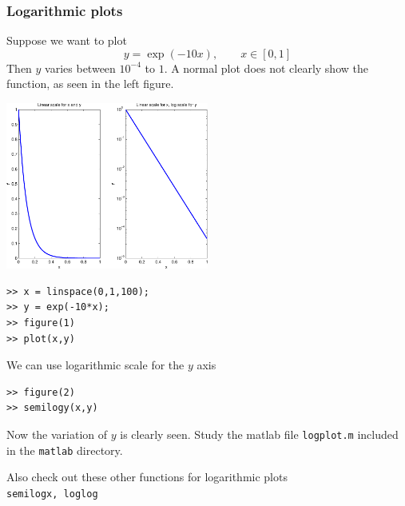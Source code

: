 \documentclass[11pt,xcolor=svgnames,onlymath]{beamer}
\begin{document}
\begin{frame}
\frametitle{Logarithmic plots}
Suppose we want to plot
\[
y = \exp(-10 x), \qquad x \in [0,1]
\]
Then $y$ varies between $10^{-4}$ to $1$. A normal plot does not clearly show the function, as seen in the left figure. 
\begin{center}
\includegraphics[width=0.5\textwidth]{logplot}
\end{center}
\begin{lstlisting}
>> x = linspace(0,1,100);
>> y = exp(-10*x);
>> figure(1)
>> plot(x,y)
\end{lstlisting}
We can use logarithmic scale for the $y$ axis
\begin{lstlisting}
>> figure(2)
>> semilogy(x,y)
\end{lstlisting}
Now the variation of $y$ is clearly seen. Study the matlab file {\tt logplot.m} included in the {\tt matlab} directory.

\vspace{2mm}

Also check out these other functions for logarithmic plots\\
{\tt semilogx, loglog}
\end{frame}
\end{document}
